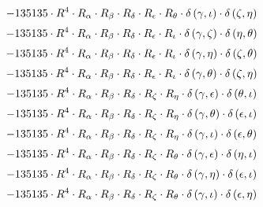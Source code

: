 \begin{subequations}
\begin{gather}
 \\[0.2em] \notag 		 - 135135 \cdot R^{4} \cdot R_{\alpha{}} \cdot R_{\beta{}} \cdot R_{\delta{}} \cdot R_{\epsilon{}} \cdot R_{\theta{}} \cdot \delta{}\left(\gamma{}, \iota{}\right) \cdot \delta{}\left(\zeta{}, \eta{}\right) 
 \\[0.2em] \notag 		 - 135135 \cdot R^{4} \cdot R_{\alpha{}} \cdot R_{\beta{}} \cdot R_{\delta{}} \cdot R_{\epsilon{}} \cdot R_{\iota{}} \cdot \delta{}\left(\gamma{}, \zeta{}\right) \cdot \delta{}\left(\eta{}, \theta{}\right) 
 \\[0.2em] \notag 		 - 135135 \cdot R^{4} \cdot R_{\alpha{}} \cdot R_{\beta{}} \cdot R_{\delta{}} \cdot R_{\epsilon{}} \cdot R_{\iota{}} \cdot \delta{}\left(\gamma{}, \eta{}\right) \cdot \delta{}\left(\zeta{}, \theta{}\right) 
 \\[0.2em] \notag 		 - 135135 \cdot R^{4} \cdot R_{\alpha{}} \cdot R_{\beta{}} \cdot R_{\delta{}} \cdot R_{\epsilon{}} \cdot R_{\iota{}} \cdot \delta{}\left(\gamma{}, \theta{}\right) \cdot \delta{}\left(\zeta{}, \eta{}\right) 
 \\[0.2em] \notag 		 - 135135 \cdot R^{4} \cdot R_{\alpha{}} \cdot R_{\beta{}} \cdot R_{\delta{}} \cdot R_{\zeta{}} \cdot R_{\eta{}} \cdot \delta{}\left(\gamma{}, \epsilon{}\right) \cdot \delta{}\left(\theta{}, \iota{}\right) 
 \\[0.2em] \notag 		 - 135135 \cdot R^{4} \cdot R_{\alpha{}} \cdot R_{\beta{}} \cdot R_{\delta{}} \cdot R_{\zeta{}} \cdot R_{\eta{}} \cdot \delta{}\left(\gamma{}, \theta{}\right) \cdot \delta{}\left(\epsilon{}, \iota{}\right) 
 \\[0.2em] \notag 		 - 135135 \cdot R^{4} \cdot R_{\alpha{}} \cdot R_{\beta{}} \cdot R_{\delta{}} \cdot R_{\zeta{}} \cdot R_{\eta{}} \cdot \delta{}\left(\gamma{}, \iota{}\right) \cdot \delta{}\left(\epsilon{}, \theta{}\right) 
 \\[0.2em] \notag 		 - 135135 \cdot R^{4} \cdot R_{\alpha{}} \cdot R_{\beta{}} \cdot R_{\delta{}} \cdot R_{\zeta{}} \cdot R_{\theta{}} \cdot \delta{}\left(\gamma{}, \epsilon{}\right) \cdot \delta{}\left(\eta{}, \iota{}\right) 
 \\[0.2em] \notag 		 - 135135 \cdot R^{4} \cdot R_{\alpha{}} \cdot R_{\beta{}} \cdot R_{\delta{}} \cdot R_{\zeta{}} \cdot R_{\theta{}} \cdot \delta{}\left(\gamma{}, \eta{}\right) \cdot \delta{}\left(\epsilon{}, \iota{}\right) 
 \\[0.2em] \notag 		 - 135135 \cdot R^{4} \cdot R_{\alpha{}} \cdot R_{\beta{}} \cdot R_{\delta{}} \cdot R_{\zeta{}} \cdot R_{\theta{}} \cdot \delta{}\left(\gamma{}, \iota{}\right) \cdot \delta{}\left(\epsilon{}, \eta{}\right) 

\end{gather}
\end{subequations}
